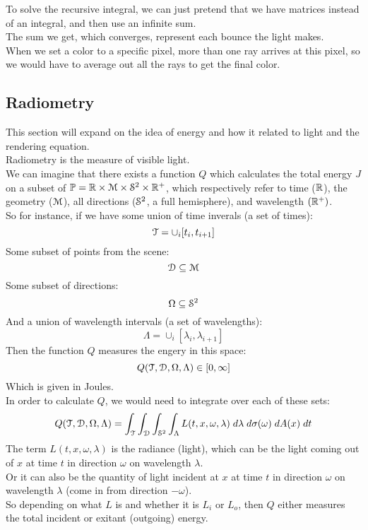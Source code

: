 \documentclass[12pt]{article}
\begin{document}
To solve the recursive integral, we can just pretend
that we have matrices instead of an integral, 
and then use an infinite sum. \\
The sum we get, which converges, represent each bounce
the light makes. \\

When we set a color to a specific pixel, more than
one ray arrives at this pixel, so we would have to
average out all the rays to get the final color. \\

\newpage

\subsection*{Radiometry}

This section will expand on the idea of energy
and how it related to light and the rendering
equation. \\

Radiometry is the measure of visible light. \\

We can imagine that there exists a function
$Q$ which calculates the total energy $J$
on a subset of
$\mathbb{P} = \mathbb{R} \times \mathcal{M} \times \mathcal{S}^2 \times \mathbb{R}^+$,
which respectively refer to time ($\mathbb{R}$),
the geometry ($\mathcal{M}$),
all directions ($\mathcal{S}^2$, a full hemisphere),
and wavelength $(\mathbb{R}^+)$. \\

So for instance, if we have some
union of time inverals (a set of times):
\[ \mathcal{T} = \cup_i[t_i, t_{i+1}] \]
Some subset of points from the scene:
\[ \mathcal{D} \subseteq \mathcal{M} \]
Some subset of directions:
\[ \Omega \subseteq \mathcal{S}^2 \]
And a union of wavelength intervals (a set of wavelengths):
\[ \Lambda = \cup_i[\lambda_i, \lambda_{i+1}] \]
Then the function $Q$ measures the engery
in this space: 
\[ Q(\mathcal{T}, \mathcal{D}, \Omega, \Lambda) \in [0, \infty] \] 
Which is given in Joules. \\

In order to calculate $Q$, we would need to
integrate over each of these sets:
\[ Q(\mathcal{T}, \mathcal{D}, \Omega, \Lambda)
= \int_{\mathcal{T}} \int_{\mathcal{D}} \int_{\mathcal{S}^2} \int_\Lambda
L(t, x, \omega, \lambda) 
\; d\lambda \; d\sigma(\omega) \; dA(x) \; dt \]
The term $L(t, x, \omega, \lambda)$
is the radiance (light),
which can be the light coming out of $x$ at time $t$
in direction $\omega$ on wavelength $\lambda$. \\
Or it can also be the quantity of 
light incident at $x$ at time $t$
in direction $\omega$ on wavelength 
$\lambda$ (come in from direction $-\omega$). \\
So depending on what $L$ is
and whether it is $L_i$ or $L_o$,
then $Q$ either measures
the total incident or exitant (outgoing) energy. \\
\end{document}
